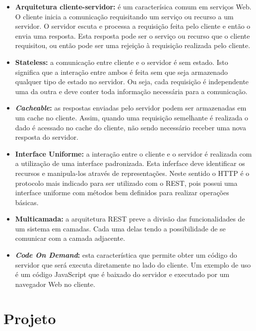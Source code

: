 \documentclass[
	12pt,				%
	openright,			%
	oneside,			%
	a4paper,			%
	english,			%
	french,				%
	spanish,			%
	brazil				%
	]{abntex2}
\begin{document}
\begin{itemize}
	\item \textbf{Arquitetura cliente-servidor:} é um caracterísica comum em serviços Web. O cliente inicia a comunicação requisitando um serviço ou recurso a um servidor. O servidor escuta e processa a requisição feita pelo cliente e então o envia uma resposta. Esta resposta pode ser o serviço ou recurso que o cliente requisitou, ou então pode ser uma rejeição à requisição realizada pelo cliente.  
	\item \textbf{Stateless:} a comunicação entre cliente e o servidor é sem estado. Isto significa que a interação entre ambos é feita sem que seja armazenado qualquer tipo de estado no servidor. Ou seja, cada requisição é independente uma  da outra e deve conter toda informação necessária para a comunicação.  
	\item \textbf{\textit{Cacheable}:} as respostas enviadas pelo servidor podem ser armazenadas em um cache no cliente. Assim, quando uma requisição semelhante é realizada o dado é acessado no cache do cliente, não sendo necessário receber uma nova resposta do servidor. 
	\item \textbf{Interface Uniforme:} a interação entre o cliente e o servidor é realizada com a utilização de uma interface padronizada. Esta inferface deve identificar os recursos e manipula-los através de representações. Neste sentido o HTTP é o protocolo mais indicado para ser utilizado com o REST, pois possui uma interface uniforme com métodos bem definidos para realizar operações básicas.
	\item \textbf{Multicamada:} a arquitetura REST preve a divisão das funcionalidades de um sistema em camadas. Cada uma delas tendo a possibilidade de se comunicar com a camada adjacente.
	\item \textbf{\textit{Code On Demand}:}  esta característica que permite obter um código do servidor que será executa diretamente no lado do cliente. Um exemplo de uso é um código JavaScript que é baixado do servidor e executado por um navegador Web no cliente.           
\end{itemize}  



 

\chapter{Projeto}\label{cap-projeto}
\end{document}
